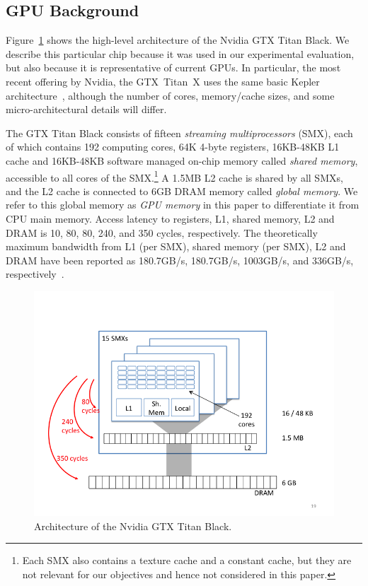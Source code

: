 \subsection{GPU Background}  \label{GPUBackground}

Figure~\ref{Nvidia680Arch} shows the high-level architecture of the Nvidia GTX Titan Black.
We describe this particular chip because it was used in our experimental evaluation, but also
because it is representative of current GPUs.
In particular, the most recent offering by Nvidia, the GTX~Titan~X uses the same basic Kepler
architecture~\cite{nvidia780}, although the number of cores, memory/cache sizes, and some
micro-architectural details will differ.

The GTX Titan Black consists of fifteen \emph{streaming multiprocessors} (SMX), 
each of which contains 192 computing cores, 64K 4-byte registers, 16KB-48KB L1 cache and 16KB-48KB
software managed on-chip memory called \emph{shared memory}, accessible to all cores of the
SMX.\footnote{ 
	Each SMX also contains a texture cache and a constant cache, 
	but they are not relevant for our objectives and hence not considered in this paper.}
A 1.5MB L2 cache is shared by all SMXs, and the L2 cache is connected to
6GB DRAM memory called \emph{global memory}.
We refer to this global memory as \emph{GPU memory} in this paper 
to differentiate it from CPU main memory.
Access latency to registers, L1, shared memory, L2 and DRAM is 10, 80, 80, 240, and 350 cycles,
respectively.
The theoretically maximum bandwidth from L1 (per SMX), shared memory (per SMX), L2 and DRAM have been reported as 180.7GB/s, 180.7GB/s,
1003GB/s, and 336GB/s, respectively~\cite{insideKepler}.


\begin{figure}
\center
\includegraphics[scale=0.3]{Nvidia680Arch.png}
\caption{\footnotesize\textnormal{Architecture of the Nvidia GTX Titan Black.}}
\label{Nvidia680Arch}
\vspace{-0.4cm}
\end{figure}

